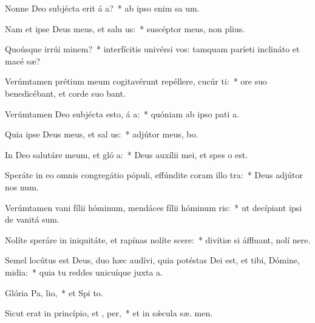 \item Nonne Deo subjécta erit á a?~* ab ipso enim sa um.
\item Nam et ipse Deus meus, et salu us:~* suscéptor meus, non  plius.
\item Quoúsque irrúi  minem?~* interfícitis univérsi vos: tamquam paríeti inclináto et macé sæ?
\item Verúmtamen prétium meum cogitavérunt repéllere, cucúr  ti:~* ore suo benedicébant, et corde suo bant.
\item Verúmtamen Deo subjécta esto, á a:~* quóniam ab ipso pati a.
\item Quia ipse Deus meus, et sal us:~* adjútor meus,  bo.
\item In Deo salutáre meum, et gló a:~* Deus auxílii mei, et spes   o est.
\item Speráte in eo omnis congregátio pópuli, effúndite coram illo  tra:~* Deus adjútor nos  num.
\item Verúmtamen vani fílii hóminum, mendáces fílii hóminum  ris:~* ut decípiant ipsi de vanitá  sum.
\item Nolíte speráre in iniquitáte, et rapínas nolíte scere:~* divítiæ si áffluant, nolí  nere.
\item Semel locútus est Deus, duo hæc audívi, quia potéstas Dei est, et tibi, Dómine, midia:~* quia tu reddes unicuíque juxta  a.
\item Glória Pa,  lio,~* et Spi to.
\item Sicut erat in princípio, et ,  per,~* et in sǽcula sæ. men.
